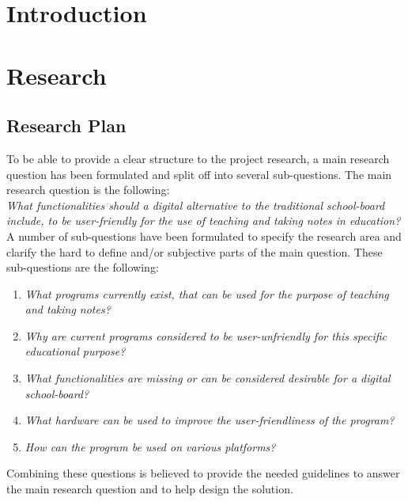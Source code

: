 \documentclass[a4paper,12pt]{article}
\begin{document}
\tableofcontents

\newpage
\section{Introduction}

\newpage

\section{Research}

\subsection{Research Plan}

To be able to provide a clear structure to the project research, a main research question has been formulated and split off into several sub-questions. The main research question is the following:\\

\textit{What functionalities should a digital alternative to the traditional school-board include, to be user-friendly for the use of teaching and taking notes in education?}\\

A number of sub-questions have been formulated to specify the research area and clarify the hard to define and/or subjective parts of the main question. These sub-questions are the following:

\begin{enumerate}
\item \textit{What programs currently exist, that can be used for the purpose of teaching and taking notes?}
\item \textit{Why are current programs considered to be user-unfriendly for this specific educational purpose?}
\item \textit{What functionalities are missing or can be considered desirable for a digital school-board?}
\item \textit{What hardware can be used to improve the user-friendliness of the program?}
\item \textit{How can the program be used on various platforms?}
\end{enumerate}


Combining these questions is believed to provide the needed guidelines to answer the main research question and to help design the solution.
\end{document}
